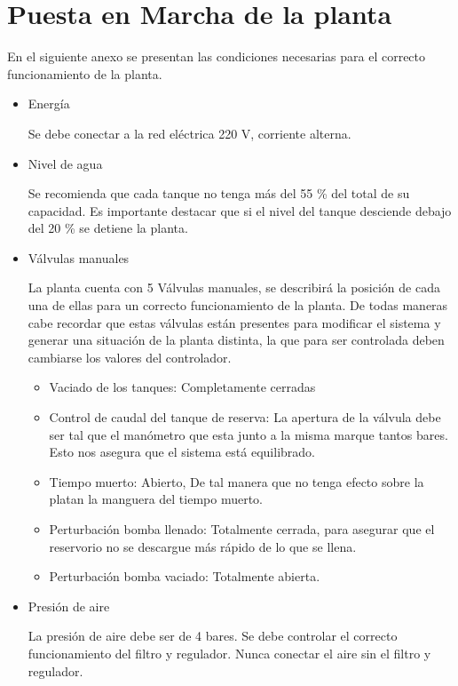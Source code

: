 \section{Puesta en Marcha de la planta}
\label{anexo:puestaEnMarcha}

En el siguiente anexo se presentan las condiciones necesarias para el
correcto funcionamiento de la planta.

\begin{itemize}
 \item Energía
 
 Se debe conectar a la red eléctrica 220 V, corriente alterna.
 
 \item Nivel de agua
 
 Se recomienda que cada tanque no tenga más del 55 \% del total de su 
 capacidad. Es importante destacar que si el nivel del tanque desciende
 debajo del 20 \% se detiene la planta. 
 
 \item Válvulas manuales
 
 La planta cuenta con 5 Válvulas manuales, se describirá la posición de 
 cada una de ellas para un correcto funcionamiento de la planta. De todas
 maneras cabe recordar que estas válvulas están presentes para modificar el 
 sistema y generar una situación de la planta distinta, la que para ser 
 controlada deben cambiarse los valores del controlador.
 
 \begin{itemize}
  \item Vaciado de los tanques: Completamente cerradas
  \item Control de caudal del tanque de reserva:
  La apertura de la válvula debe ser tal que el manómetro que esta junto
  a la misma marque tantos bares. Esto nos asegura que el sistema está 
  equilibrado.
  \item Tiempo muerto: Abierto, De tal manera que no tenga efecto sobre la 
  platan la manguera del tiempo muerto.
  \item Perturbación bomba llenado: Totalmente cerrada, para asegurar que el 
  reservorio no se descargue más rápido de lo que se llena.
  \item Perturbación bomba vaciado: Totalmente abierta.
 \end{itemize}

 \item Presión de aire
 
 La presión de aire debe ser de 4 bares. Se debe controlar el correcto 
 funcionamiento del filtro y regulador. Nunca conectar el aire sin el filtro y 
 regulador.
 

\end{itemize}
